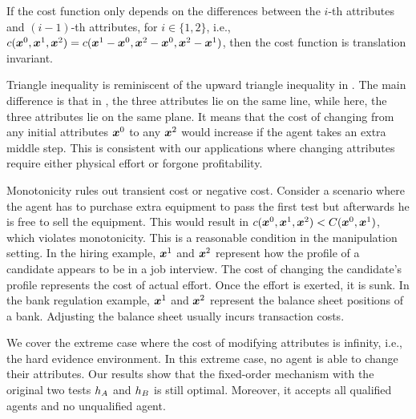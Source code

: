 If the cost function only depends on the differences between the $i$-th attributes and $(i-1)$-th attributes, for $i\in \{1,2\}$, i.e., 
$c(\boldsymbol{x}^0,\boldsymbol{x}^1,\boldsymbol{x}^2)=c(\boldsymbol{x}^1-\boldsymbol{x}^0,\boldsymbol{x}^2 -\boldsymbol{x}^0, \boldsymbol{x}^2-\boldsymbol{x}^1)$, then the cost function is translation invariant. 


Triangle inequality is reminiscent of the upward triangle inequality in \citet{perez2022test}.
The main difference is that in \citet{perez2022test}, the three attributes lie on the same line, while here, the three attributes lie on the same plane.
It means that the cost of changing from any initial attributes $\boldsymbol{x}^0$ to any $\boldsymbol{x}^2$ would increase if the agent takes an extra middle step.
This is consistent with our applications where changing attributes require either physical effort or forgone profitability.

Monotonicity rules out transient cost or negative cost. 
Consider a scenario where the agent has to purchase extra equipment to pass the first test but afterwards he is free to sell the equipment.
This would result in $c(\boldsymbol{x}^0, \boldsymbol{x}^1,\boldsymbol{x}^2)<C(\boldsymbol{x}^0, \boldsymbol{x}^1)$, which violates monotonicity.
This is a reasonable condition in the manipulation setting. 
In the hiring example, $\boldsymbol{x}^1$ and $\boldsymbol{x}^2$ represent how the profile of a candidate appears to be in a job interview.
The cost of changing the candidate's profile represents the cost of actual effort.
Once the effort is exerted, it is sunk.
In the bank regulation example, $\boldsymbol{x}^1$ and $\boldsymbol{x}^2$ represent the balance sheet positions of a bank.
Adjusting the balance sheet usually incurs transaction costs.



We cover the extreme case where the cost of modifying attributes is infinity, i.e., the hard evidence environment. In this extreme case, no agent is able to change their attributes. Our results show that the fixed-order mechanism with the original two tests $h_A$ and $h_B$ is still optimal. Moreover, it accepts all qualified agents and no unqualified agent. 



